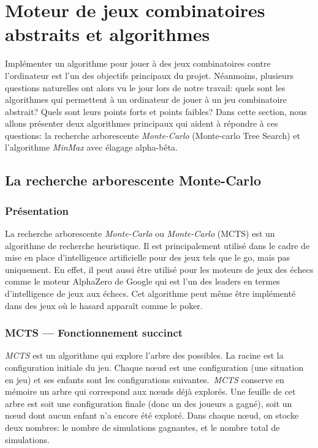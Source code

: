 \section{Moteur de jeux combinatoires abstraits et algorithmes}





Implémenter un algorithme pour jouer à des jeux combinatoires contre l'ordinateur est l'un des objectifs principaux du projet. 
Néanmoins, plusieurs questions naturelles ont alors vu le jour lors de notre travail: quels sont les algorithmes qui permettent à un ordinateur
de jouer à un jeu combinatoire abstrait? Quels sont leurs points forts et points faibles? Dans cette section, nous allons
présenter deux algorithmes principaux qui aident à répondre à ces questions: la recherche arborescente \emph{Monte-Carlo} (Monte-carlo Tree Search) 
et l'algorithme \emph{MinMax} avec élagage alpha-bêta.

\subsection{La recherche arborescente Monte-Carlo}

\subsubsection{Présentation}
La recherche arborescente \emph{Monte-Carlo} ou \emph{Monte-Carlo} (MCTS) est un algorithme de recherche heuristique.
Il est principalement utilisé dans le cadre de mise en place d'intelligence artificielle pour des jeux tels que le go, mais pas uniquement.
En effet, il peut aussi être utilisé pour les moteurs de jeux des échecs comme le moteur AlphaZero de Google qui est
l'un des leaders en termes d'intelligence de jeux aux échecs. Cet algorithme peut même être implémenté dans des jeux où le hasard 
apparaît comme le poker.

\subsubsection{MCTS --- Fonctionnement succinct}
\emph{MCTS} est un algorithme qui explore l'arbre des possibles. La racine est la configuration initiale du jeu.
Chaque nœud est une configuration (une situation en jeu) et ses enfants sont les configurations suivantes.\ \emph{MCTS} conserve en mémoire 
un arbre qui correspond aux nœuds déjà explorés. Une feuille de cet arbre est soit une configuration finale (donc un des joueurs a gagné),
soit un nœud dont aucun enfant n'a encore été exploré. Dans chaque nœud, on stocke deux nombres: le nombre de simulations gagnantes, 
et le nombre total de simulations. 

